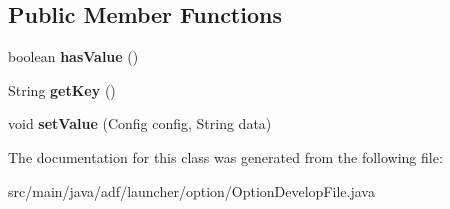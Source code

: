\subsection*{Public Member Functions}
\begin{DoxyCompactItemize}
\item 
\hypertarget{classadf_1_1launcher_1_1option_1_1OptionDevelopFile_ae802912681e9c05daebda71b6dee7e8b}{}\label{classadf_1_1launcher_1_1option_1_1OptionDevelopFile_ae802912681e9c05daebda71b6dee7e8b} 
boolean {\bfseries has\+Value} ()
\item 
\hypertarget{classadf_1_1launcher_1_1option_1_1OptionDevelopFile_acf37257ebe0d55127a0edd2ccbc6adde}{}\label{classadf_1_1launcher_1_1option_1_1OptionDevelopFile_acf37257ebe0d55127a0edd2ccbc6adde} 
String {\bfseries get\+Key} ()
\item 
\hypertarget{classadf_1_1launcher_1_1option_1_1OptionDevelopFile_a4fa7ba5359a4501a905485262b1762ea}{}\label{classadf_1_1launcher_1_1option_1_1OptionDevelopFile_a4fa7ba5359a4501a905485262b1762ea} 
void {\bfseries set\+Value} (Config config, String data)
\end{DoxyCompactItemize}


The documentation for this class was generated from the following file\+:\begin{DoxyCompactItemize}
\item 
src/main/java/adf/launcher/option/Option\+Develop\+File.\+java\end{DoxyCompactItemize}
